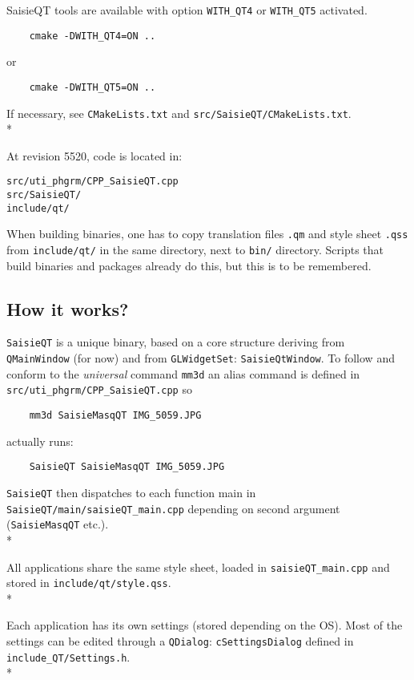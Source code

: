 \documentclass[a4paper]{book}
\begin{document}
SaisieQT tools are available with option {\tt WITH\_QT4} or {\tt WITH\_QT5} activated.

\begin{verbatim}
    cmake -DWITH_QT4=ON ..
\end{verbatim}
 or
\begin{verbatim}
    cmake -DWITH_QT5=ON ..
\end{verbatim}

If necessary, see {\tt CMakeLists.txt} and {\tt src/SaisieQT/CMakeLists.txt}.\\*

At revision 5520, code is located in:
\begin{verbatim}
src/uti_phgrm/CPP_SaisieQT.cpp
src/SaisieQT/
include/qt/
\end{verbatim}

When building binaries, one has to copy translation files {\tt .qm} and style sheet {\tt .qss} from {\tt include/qt/} in the same directory, next to {\tt bin/} directory. Scripts that build binaries and packages already do this, but this is to be remembered.

\subsection{How it works?}

{\tt SaisieQT} is a unique binary, based on a core structure deriving from {\tt QMainWindow} (for now) and from {\tt GLWidgetSet}: {\tt SaisieQtWindow}. To follow and conform to the \textit{universal} command {\tt mm3d} an alias command is defined in {\tt src/uti\_phgrm/CPP\_SaisieQT.cpp} so 

\begin{verbatim}
	mm3d SaisieMasqQT IMG_5059.JPG
\end{verbatim}

actually runs:

\begin{verbatim}
	SaisieQT SaisieMasqQT IMG_5059.JPG
\end{verbatim}

{\tt SaisieQT} then dispatches to each function main in {\tt SaisieQT/main/saisieQT\_main.cpp}  depending on second argument ({\tt SaisieMasqQT} etc.).\\*

All applications share the same style sheet, loaded in {\tt saisieQT\_main.cpp} and stored in {\tt include/qt/style.qss}.\\*

Each application has its own settings (stored depending on the OS). Most of the settings can be edited through a {\tt QDialog}: {\tt cSettingsDialog} defined in {\tt include\_QT/Settings.h}.\\*
\end{document}
